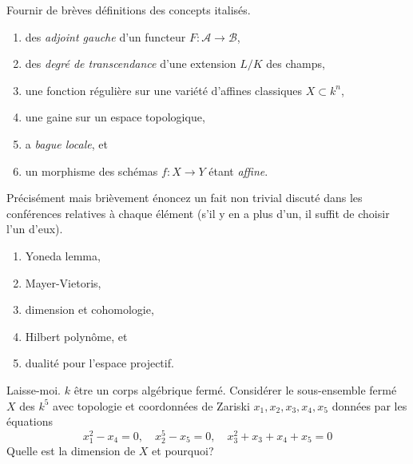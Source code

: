 \begin{exercise}[Definitions]
\label{exercise-definitions-fall-2017}
Fournir de brèves définitions des concepts italisés.
\begin{enumerate}
\item des {\it adjoint gauche} d'un functeur $F : \mathcal{A} \to \mathcal{B}$,
\item des {\it degré de transcendance} d'une extension $L/K$ des champs,
\item une fonction régulière {\it} sur une variété d'affines classiques
$X \subset k^n$,
\item une gaine {\it} sur un espace topologique,
\item a {\it bague locale}, et
\item un morphisme des schémas $f : X \to Y$ étant {\it affine}.
\end{enumerate}
\end{exercise}

\begin{exercise}[Theorems]
\label{exercise-results-fall-2017}
Précisément mais brièvement énoncez un fait non trivial discuté dans les conférences relatives à
chaque élément (s'il y en a plus d'un, il suffit de choisir
l'un d'eux).
\begin{enumerate}
\item Yoneda lemma,
\item Mayer-Vietoris,
\item dimension et cohomologie,
\item Hilbert polynôme, et
\item dualité pour l'espace projectif.
\end{enumerate}
\end{exercise}

\begin{exercise}
\label{exercise-compute-dimension}
Laisse-moi. $k$ être un corps algébrique fermé. Considérer le sous-ensemble fermé $X$
des $k^5$ avec topologie et coordonnées de Zariski $x_1, x_2, x_3, x_4, x_5$
données par les équations
$$
x_1^2 - x_4 = 0,\quad
x_2^5 - x_5 = 0,\quad
x_3^2 + x_3 + x_4 + x_5 = 0
$$
Quelle est la dimension de $X$ et pourquoi?
\end{exercise}

